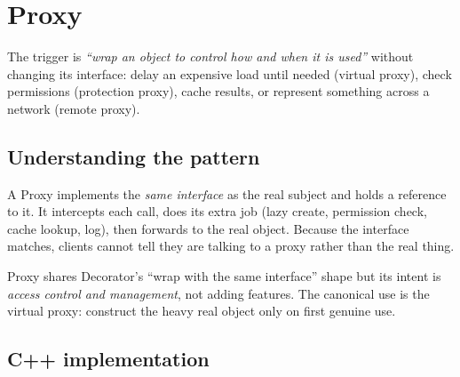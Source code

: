 \section{Proxy}
\label{sec:pat-proxy}


\begin{patternbox}
The trigger is \emph{``wrap an object to control how and when it is
used''} without changing its interface: delay an expensive load until
needed (virtual proxy), check permissions (protection proxy), cache
results, or represent something across a network (remote proxy).
\end{patternbox}

\subsection*{Understanding the pattern}

A Proxy implements the \emph{same interface} as the real subject and holds
a reference to it. It intercepts each call, does its extra job (lazy
create, permission check, cache lookup, log), then forwards to the real
object. Because the interface matches, clients cannot tell they are
talking to a proxy rather than the real thing.

\begin{ideabox}
Proxy shares Decorator's ``wrap with the same interface'' shape but its
intent is \emph{access control and management}, not adding features. The
canonical use is the virtual proxy: construct the heavy real object only
on first genuine use.
\end{ideabox}

\subsection*{C++ implementation}

